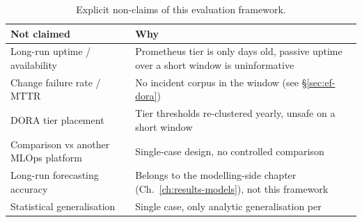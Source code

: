 \begin{table}[h]
  \centering
  \caption{Explicit non-claims of this evaluation framework.}
  \label{tab:ef-non-claims}
  \begin{tabularx}{\linewidth}{@{}l X@{}}
    \toprule
    \textbf{Not claimed} & \textbf{Why} \\
    \midrule
    Long-run uptime / availability       & Prometheus tier is only days old, passive uptime over a short window is uninformative \\
    Change failure rate / MTTR           & No incident corpus in the window (see \S\ref{sec:ef-dora}) \\
    DORA tier placement                  & Tier thresholds re-clustered yearly, unsafe on a short window \\
    Comparison vs another MLOps platform & Single-case design, no controlled comparison \\
    Long-run forecasting accuracy        & Belongs to the modelling-side chapter (Ch.~\ref{ch:results-models}), not this framework \\
    Statistical generalisation           & Single case, only analytic generalisation per~\cite{runeson2009casestudy} \\
    \bottomrule
  \end{tabularx}
\end{table}
